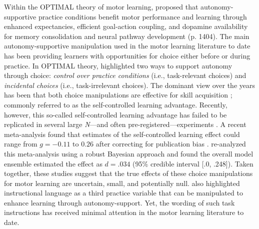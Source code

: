 \documentclass[doc,floatsintext,donotrepeattitle,letterpaper,12pt]{apa7}
\begin{document}
Within the OPTIMAL theory of motor learning, \textcite{wulf2016} proposed that autonomy-supportive practice conditions benefit motor performance and learning through enhanced expectancies, efficient goal-action coupling, and dopamine availability for memory consolidation and neural pathway development (p. 1404). The main autonomy-supportive manipulation used in the motor learning literature to date has been providing learners with opportunities for choice either before or during practice. In OPTIMAL theory, \textcite{wulf2016} highlighted two ways to support autonomy through choice: \emph{control over practice conditions} (i.e., task-relevant choices) and \emph{incidental choices} (i.e., task-irrelevant choices). The dominant view over the years has been that both choice manipulations are effective for skill acquisition \autocite[e.g.,][]{carter2014,carter2017,chiviacowsky2002,chiviacowsky2005,lewthwaite2015,wulf2014,wulf2018}; commonly referred to as the self-controlled learning advantage. Recently, however, this so-called self-controlled learning advantage has failed to be replicated in several large \emph{N}---and often pre-registered---experiments \autocite{bacelar2022,leiker2019,mckay2020,mckay2022,stgermain2022,stgermain2023,yantha2022}. A recent meta-analysis found that estimates of the self-controlled learning effect could range from $g = -0.11 \text{ to } 0.26$ after correcting for publication bias \autocite{mckay2022a}. \textcite{mckay2023} re-analyzed this meta-analysis using a robust Bayesian approach \autocite{bartos2023,maier2023} and found the overall model ensemble estimated the effect as $d = .034$ (95\% credible interval [.0, .248]). Taken together, these studies suggest that the true effects of these choice manipulations for motor learning are uncertain, small, and potentially null. \textcite{wulf2016} also highlighted instructional language as a third practice variable that can be manipulated to enhance learning through autonomy-support. Yet, the wording of such task instructions has received minimal attention in the motor learning literature to date.
\end{document}
